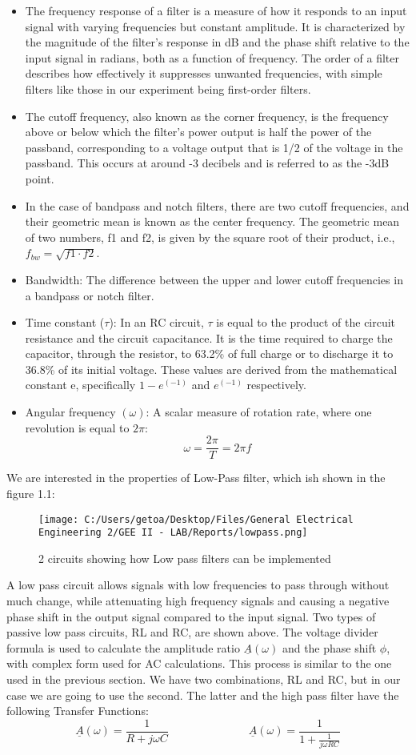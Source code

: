 \documentclass[12pt]{report}
\begin{document}
\begin{itemize}
    \item The frequency response of a filter is a measure of how it responds to an input signal with varying frequencies but constant amplitude. It is characterized by the magnitude of the filter's response in dB and the phase shift relative to the input signal in radians, both as a function of frequency. The order of a filter describes how effectively it suppresses unwanted frequencies, with simple filters like those in our experiment being first-order filters.
    \item The cutoff frequency, also known as the corner frequency, is the frequency above or below which the filter's power output is half the power of the passband, corresponding to a voltage output that is 1/2 of the voltage in the passband. This occurs at around -3 decibels and is referred to as the -3dB point.
    \item In the case of bandpass and notch filters, there are two cutoff frequencies, and their geometric mean is known as the center frequency. The geometric mean of two numbers, f1 and f2, is given by the square root of their product, i.e., $ f_{bw} = \sqrt{f1 \cdot f2} $.
    \item Bandwidth: The difference between the upper and lower cutoff frequencies in a bandpass or notch filter.
    \item Time constant ($\tau$): In an RC circuit, $\tau$ is equal to the product of the circuit resistance and the circuit capacitance. It is the time required to charge the capacitor, through the resistor, to 63.2\% of full charge or to discharge it to 36.8\% of its initial voltage. These values are derived from the mathematical constant e, specifically $1 - e^{(-1)}$ and $e^{(-1)}$ respectively.
   \item Angular frequency $(\omega)$: A scalar measure of rotation rate, where one revolution is equal to $2\pi$:
$$ \omega = \frac{2\pi}{T}= 2\pi f $$
\end{itemize}
We are interested in the properties of Low-Pass filter, which ish shown in the figure 1.1:
\begin{figure}[!htp]
  \centering
  \texttt{[image: C:/Users/getoa/Desktop/Files/General Electrical Engineering 2/GEE II - LAB/Reports/lowpass.png]}
  \caption{2 circuits showing how Low pass filters can be implemented}
\end{figure}
A low pass circuit allows signals with low frequencies to pass through without much change, while attenuating high frequency signals and causing a negative phase shift in the output signal compared to the input signal. Two types of passive low pass circuits, RL and RC, are shown above. The voltage divider formula is used to calculate the amplitude ratio $\underline A (\omega)$ and the phase shift $ \phi$, with complex form used for AC calculations. This process is similar to the one used in the previous section. We have two combinations, RL and RC, but in our case we are going to use the second. The latter and the high pass filter have the following Transfer Functions:
$$\underline A(\omega) =  \frac{1}{R+j \omega C} \hspace{3cm} \underline A(\omega) =  \frac{1}{1+\frac{1}{j \omega RC}}$$
\end{document}
